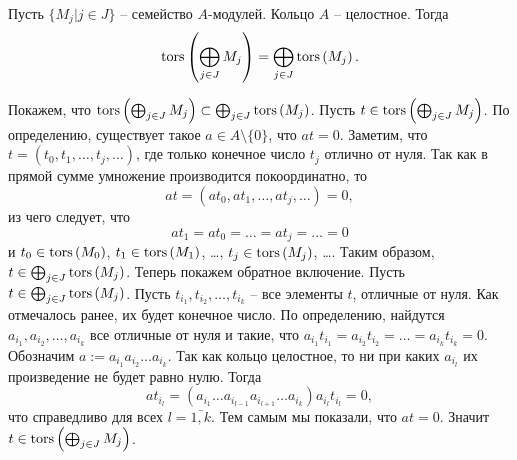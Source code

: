     \begin{Proposal} \label{torsIdentity}
        Пусть $\{M_j | j \in J\}$ -- семейство $A$-модулей. Кольцо $A$ -- целостное. Тогда
        \begin{equation*}
            \textup{tors}\left(\bigoplus_{j \in J} M_j\right) = \bigoplus_{j \in J} \textup{tors}\left(M_j\right).
        \end{equation*}
    \end{Proposal}
    \begin{Proof}
        Покажем, что $\textup{tors}\left(\bigoplus_{j \in J} M_j\right) \subset \bigoplus_{j \in J} \textup{tors}\left(M_j\right)$. 
        Пусть $t \in \textup{tors}\left(\bigoplus_{j \in J} M_j\right)$. По определению, существует такое 
        $a \in A \setminus \{0\}$, что $at = 0$. Заметим, что $t = (t_0, t_1, \dots, t_j, \dots)$, где 
        только конечное число $t_j$ отлично от нуля. Так как в прямой сумме умножение производится
        покоординатно, то 
        \begin{equation*}
            at = (at_0, at_1, \dots, at_j, \dots) = 0,
        \end{equation*}
        из чего следует, что 
        \begin{equation*}
            at_1 = at_0 = \dots = at_j = \dots = 0
        \end{equation*}
        и $t_0 \in \textup{tors}\left(M_0\right)$, $t_1 \in \textup{tors}\left(M_1\right)$, \dots, $t_j \in \textup{tors}\left(M_j\right)$, \dots . 
        Таким образом, $t \in \bigoplus_{j \in J} \textup{tors}\left(M_j\right)$. Теперь покажем обратное включение.
        Пусть $t \in \bigoplus_{j \in J} \textup{tors}\left(M_j\right)$. Пусть $t_{i_1}, t_{i_2}, \dots, t_{i_k}$ 
        -- все элементы $t$, отличные от нуля. Как отмечалось ранее, их будет конечное число. По определению, 
        найдутся  $a_{i_1}, a_{i_2}, \dots, a_{i_k}$ все отличные от нуля и такие, 
        что $a_{i_1}t_{i_1} = a_{i_2}t_{i_2} = \dots = a_{i_k}t_{i_k} = 0$. Обозначим 
        $a := a_{i_1}a_{i_2}\dots a_{i_k}$. Так как кольцо целостное, то ни при каких $a_{i_l}$ их
        произведение не будет равно нулю. Тогда
        \begin{equation*}
            at_{i_l} = (a_{i_1}\dots a_{i_{l-1}}a_{i_{l + 1}}\dots a_{i_k})a_{i_l}t_{i_l} = 0,
        \end{equation*}
        что справедливо для всех $l = \bar{1,k}$. Тем самым мы показали, что $at = 0$. Значит 
        $t \in \textup{tors}\left(\bigoplus_{j \in J} M_j\right)$.
    \end{Proof}

